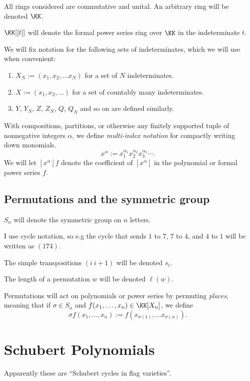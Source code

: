\documentclass{article}
\begin{document}
All rings considered are commutative and unital. An arbitrary ring will be denoted $\KK$. 

$\KK[[t]]$ will denote the formal power series ring over $\KK$ in the indeterminate $t$.

We will fix notation for the following sets of indeterminates, which we will use when convenient:
\begin{enumerate}[label=(\alph*)]
    \item $X_N := (x_1, x_2, \ldots x_N)$ for a set of $N$ indeterminates.
    \item $X := (x_1, x_2, \ldots)$ for a set of countably many indeterminates.
    \item $Y$, $Y_N$, $Z$, $Z_N$, $Q$, $Q_N$ and so on are defined similarly.
\end{enumerate}

With compositions, partitions, or otherwise any finitely supported tuple of nonnegative integers $\alpha$, we define \textit{multi-index notation} for compactly writing down monomials.
\[
    x^\alpha := x_1^{\alpha_1}x_2^{\alpha_2}x_3^{\alpha_3}\cdots.
\]
We will let $[x^\alpha]f$ denote the coefficient of $[x^\alpha]$ in the polynomial or formal power series $f$.

\subsection{Permutations and the symmetric group}

$S_n$ will denote the symmetric group on $n$ letters.

I use cycle notation, so e.g the cycle that sends $1$ to $7$, $7$ to $4$, and $4$ to $1$ will be written as $(174)$.

The simple transpositions $(i\:i+1)$ will be denoted $s_i$.

The length of a permutation $w$ will be denoted $\ell(w)$.

Permutations will act on polynomials or power series by permuting \textit{places}, meaning that if $\sigma \in S_n$ and $f(x_1, \ldots, x_n) \in \KK[X_n]$, we define
\[
    \sigma f(x_1, \ldots, x_n) := f(x_{\sigma(1)}, \ldots x_{\sigma(n)}).
\]

\section{Schubert Polynomials}

Apparently these are ``Schubert cycles in flag varieties''.
\end{document}
